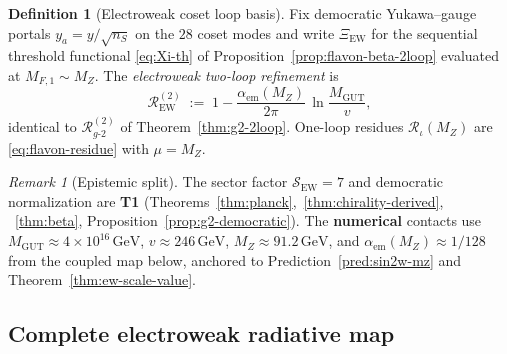 \documentclass[aps,prd,onecolumn,amsmath,amssymb,nofootinbib,11pt]{revtex4-2}
\numberwithin{equation}{section}
\theoremstyle{plain}
\theoremstyle{definition}
\newtheorem{definition}[theorem]{Definition}
\theoremstyle{remark}
\newtheorem{remark}[theorem]{Remark}
\begin{document}
\begin{definition}[Electroweak coset loop basis]\label{def:ew-coset-portal}
Fix democratic Yukawa--gauge portals $y_a=y/\sqrt{n_S}$ on the $28$ coset
modes and write $\Xi_{\mathrm{EW}}$ for the sequential threshold functional
\eqref{eq:Xi-th} of Proposition~\ref{prop:flavon-beta-2loop} evaluated at
$M_{F,1}\sim M_Z$. The \emph{electroweak two-loop refinement} is
\begin{equation}\label{eq:ew-2loop-factor}
  \mathcal{R}_{\mathrm{EW}}^{(2)}
  \;:=\;
  1 - \frac{\alpha_{\mathrm{em}}(M_Z)}{2\pi}\,
  \ln\!\frac{M_{\mathrm{GUT}}}{v},
\end{equation}
identical to $\mathcal{R}_{g\text{-}2}^{(2)}$ of Theorem~\ref{thm:g2-2loop}.
One-loop residues $\mathcal{R}_\iota(M_Z)$ are \eqref{eq:flavon-residue} with
$\mu=M_Z$.
\end{definition}

\begin{remark}[Epistemic split]
The sector factor $\mathcal{S}_{\mathrm{EW}}=7$ and democratic normalization
are \textbf{T1} (Theorems~\ref{thm:planck},~\ref{thm:chirality-derived},
~\ref{thm:beta}, Proposition~\ref{prop:g2-democratic}). The
\textbf{numerical} contacts use $M_{\mathrm{GUT}}\approx4\times10^{16}\,\mathrm{GeV}$,
$v\approx246\,\mathrm{GeV}$, $M_Z\approx91.2\,\mathrm{GeV}$, and
$\alpha_{\mathrm{em}}(M_Z)\approx1/128$ from the coupled map below, anchored
to Prediction~\ref{pred:sin2w-mz} and Theorem~\ref{thm:ew-scale-value}.
\end{remark}

\subsection{Complete electroweak radiative map}
\label{sec:ew-precision:complete}
\end{document}
